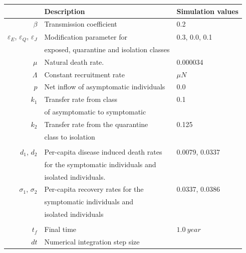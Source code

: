 \begin{table}[htb]
    \begin{center}
      \begin{tabular}{@{}rll@{}}
        \toprule
        & \multicolumn{1}{l}{\bf{Description}}
        & \multicolumn{1}{l}{\bf{Simulation values}}
        \\
        \midrule
        $\beta$
          & Transmission coefficient
          & \num{0.2}
        \\
        $\varepsilon_E$, 
        $\varepsilon_Q$,
        $\varepsilon_J$
          & Modification parameter for 
          & \num{0.3}, \num{0.0}, \num{0.1}
          \\
          &  exposed, quarantine and isolation classes 
          \\
        $\mu$
          & Natural death rate.
          & \num{0.000034}
        \\
        $\Lambda$
          & Constant recruitment rate
          & $\mu N$
        \\
        $p$
          & Net inflow of asymptomatic individuals
          & \num{0.0}
        \\
        $k_1$ 
          & Transfer rate from class 
          & \num{0.1}
          \\
          & of asymptomatic to symptomatic
          \\
        $k_2$
          & Transfer rate from the quarantine 
          & \num{0.125}
          \\ 
          & class to isolation
        \\
        \\
        $d_1$, $d_2$
          & Per-capita disease induced death rates 
          & \num{0.0079}, \num{0.0337}
          \\
          & for the symptomatic individuals and 
          \\
          & isolated individuals.
        \\
        $\sigma_1$, $\sigma_2$
          & Per-capita recovery rates for the 
          & \num{0.0337}, \num{0.0386}
          \\
          & symptomatic individuals and 
          \\
          &  isolated individuals
        \\
        \\
        $t_f$
          & Final time 
          & $\SI{1.0}{year}$
        \\
        $dt$
          & Numerical integration step size

\end{tabular}
\end{center}
\end{table}
